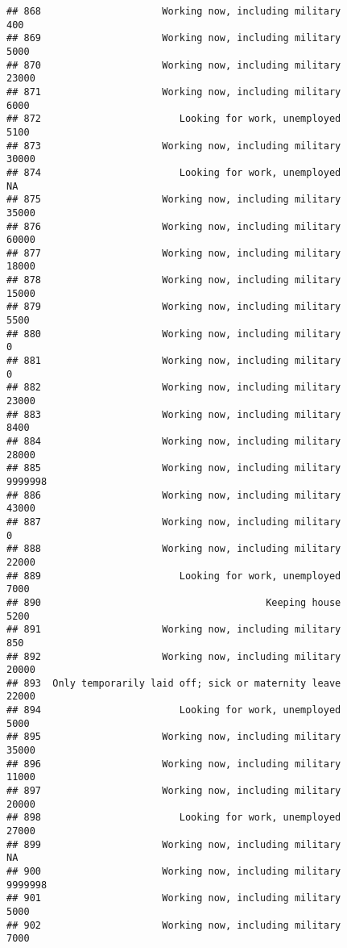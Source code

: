 \documentclass[]{book}
\theoremstyle{definition}
\theoremstyle{definition}
\theoremstyle{remark}
\begin{document}
\begin{verbatim}
## 868                     Working now, including military             400
## 869                     Working now, including military            5000
## 870                     Working now, including military           23000
## 871                     Working now, including military            6000
## 872                        Looking for work, unemployed            5100
## 873                     Working now, including military           30000
## 874                        Looking for work, unemployed              NA
## 875                     Working now, including military           35000
## 876                     Working now, including military           60000
## 877                     Working now, including military           18000
## 878                     Working now, including military           15000
## 879                     Working now, including military            5500
## 880                     Working now, including military               0
## 881                     Working now, including military               0
## 882                     Working now, including military           23000
## 883                     Working now, including military            8400
## 884                     Working now, including military           28000
## 885                     Working now, including military         9999998
## 886                     Working now, including military           43000
## 887                     Working now, including military               0
## 888                     Working now, including military           22000
## 889                        Looking for work, unemployed            7000
## 890                                       Keeping house            5200
## 891                     Working now, including military             850
## 892                     Working now, including military           20000
## 893  Only temporarily laid off; sick or maternity leave           22000
## 894                        Looking for work, unemployed            5000
## 895                     Working now, including military           35000
## 896                     Working now, including military           11000
## 897                     Working now, including military           20000
## 898                        Looking for work, unemployed           27000
## 899                     Working now, including military              NA
## 900                     Working now, including military         9999998
## 901                     Working now, including military            5000
## 902                     Working now, including military            7000

\end{verbatim}
\end{document}
